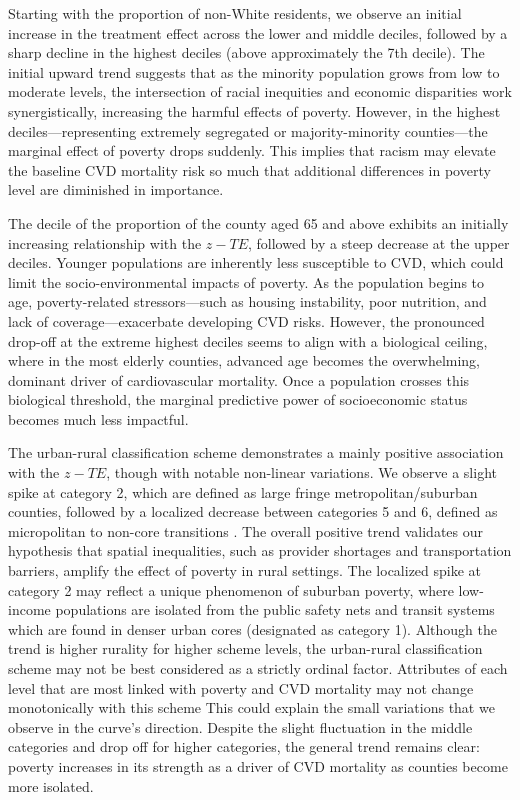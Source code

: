 \documentclass{article}
\theoremstyle{plain}
\theoremstyle{definition}
\theoremstyle{remark}
\begin{document}
Starting with the proportion of non-White 
residents, we observe an initial increase in the treatment effect across the 
lower and middle deciles, followed by a sharp decline in the highest deciles (above 
approximately the 7th decile). The initial upward trend suggests that as the minority population grows from low to 
moderate levels, the intersection of racial inequities and economic 
disparities work synergistically, increasing the harmful effects of poverty. However, in the highest deciles—representing extremely segregated or 
majority-minority counties—the marginal effect of poverty drops suddenly. 
This implies that racism may elevate 
the baseline CVD mortality risk so much that additional 
differences in poverty level are diminished in importance.

The decile of the proportion of the county aged 65 
and above exhibits an initially increasing relationship with the $z-TE$, 
followed by a steep decrease at the upper deciles. 
Younger populations are inherently less susceptible to CVD, which could limit 
the socio-environmental impacts of poverty. As the population 
begins to age, poverty-related stressors—such as housing instability, poor 
nutrition, and lack of coverage—exacerbate developing CVD risks. However, the pronounced 
drop-off at the extreme highest deciles seems to align with a biological 
ceiling, where in the most elderly counties, advanced age becomes the 
overwhelming, dominant driver of cardiovascular mortality. Once a population 
crosses this biological threshold, the marginal predictive power of socioeconomic 
status becomes much less impactful.

The urban-rural classification scheme demonstrates a 
mainly positive association with the $z-TE$, though with notable 
non-linear variations. We observe a slight spike at category 2,
which are defined as large fringe metropolitan/suburban counties, followed by a localized decrease 
between categories 5 and 6, defined as micropolitan to non-core transitions \citep{ingram20142013}. The overall positive trend validates our 
hypothesis that spatial inequalities, such as provider shortages and 
transportation barriers, amplify the effect of poverty in rural 
settings. The localized spike at category 2 may reflect a unique phenomenon of suburban poverty, where low-income populations are isolated from the public safety nets and transit systems which are found in denser urban cores (designated as category 1). Although the trend is higher rurality for higher scheme levels, the urban-rural classification scheme may not be best considered as a strictly ordinal factor. Attributes of each level that are most linked with poverty and CVD mortality may not change monotonically with this scheme This could explain the small variations that we observe in the curve's direction.
Despite the slight fluctuation in the middle categories and drop off for higher categories, the general trend
remains clear: poverty increases in its strength as a driver of CVD mortality as counties become 
more isolated.
\end{document}
